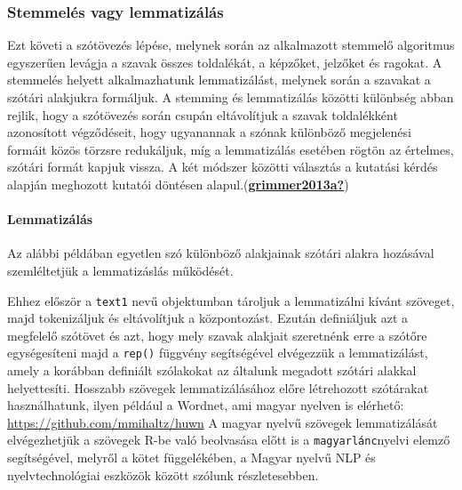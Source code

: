 \documentclass[
]{book}
\begin{document}
\hypertarget{stemmeluxe9s-vagy-lemmatizuxe1luxe1s}{%
\subsubsection{Stemmelés vagy
lemmatizálás}\label{stemmeluxe9s-vagy-lemmatizuxe1luxe1s}}

Ezt követi a szótövezés lépése, melynek során az alkalmazott stemmelő
algoritmus egyszerűen levágja a szavak összes toldalékát, a képzőket,
jelzőket és ragokat. A stemmelés helyett alkalmazhatunk lemmatizálást,
melynek során a szavakat a szótári alakjukra formáljuk. A stemming és
lemmatizálás közötti különbség abban rejlik, hogy a szótövezés során
csupán eltávolítjuk a szavak toldalékként azonosított végződéseit, hogy
ugyanannak a szónak különböző megjelenési formáit közös törzsre
redukáljuk, míg a lemmatizálás esetében rögtön az értelmes, szótári
formát kapjuk vissza. A két módszer közötti választás a kutatási kérdés
alapján meghozott kutatói döntésen
alapul.(\protect\hyperlink{ref-grimmer2013a}{\textbf{grimmer2013a?}})

\hypertarget{lemmatizuxe1luxe1s}{%
\paragraph{Lemmatizálás}\label{lemmatizuxe1luxe1s}}

Az alábbi példában egyetlen szó különböző alakjainak szótári alakra
hozásával szemléltetjük a lemmatizáslás működését.

Ehhez először a \texttt{text1} nevű objektumban tároljuk a lemmatizálni
kívánt szöveget, majd tokenizáljuk és eltávolítjuk a központozást.
Ezután definiáljuk azt a megfelelő szótövet és azt, hogy mely szavak
alakjait szeretnénk erre a szótőre egységesíteni majd a \texttt{rep()}
függvény segítségével elvégezzük a lemmatizálást, amely a korábban
definiált szólakokat az általunk megadott szótári alakkal helyettesíti.
Hosszabb szövegek lemmatizálásához előre létrehozott szótárakat
használhatunk, ilyen például a Wordnet, ami magyar nyelven is elérhető:
\url{https://github.com/mmihaltz/huwn} A magyar nyelvű szövegek
lemmatizálását elvégezhetjük a szövegek R-be való beolvasása előtt is a
\texttt{magyarlánc}nyelvi elemző segítségével, melyről a kötet
függelékében, a Magyar nyelvű NLP és nyelvtechnológiai eszközök között
szólunk részletesebben.
\end{document}
